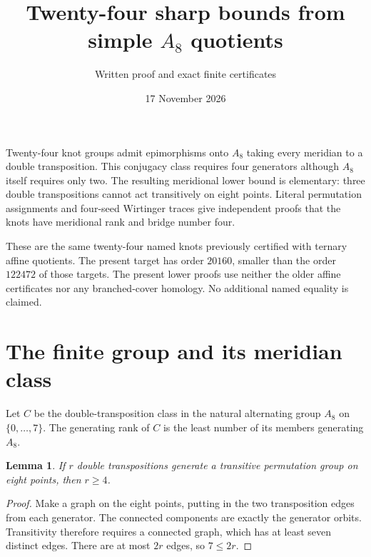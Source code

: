 \documentclass[11pt]{article}
\title{Twenty-four sharp bounds from simple $A_8$ quotients}
\author{Written proof and exact finite certificates}
\date{17 November 2026}
\newtheorem{lemma}[theorem]{Lemma}
\begin{document}
\maketitle

Twenty-four knot groups admit epimorphisms onto $A_8$ taking every
meridian to a double transposition. This conjugacy class requires four
generators although $A_8$ itself requires only two. The resulting
meridional lower bound is elementary: three double transpositions
cannot act transitively on eight points. Literal permutation assignments
and four-seed Wirtinger traces give independent proofs that the knots
have meridional rank and bridge number four.

These are the same twenty-four named knots previously certified with
ternary affine quotients. The present target has order $20160$, smaller
than the order $122472$ of those targets. The present lower proofs use
neither the older affine certificates nor any branched-cover homology.
No additional named equality is claimed.

\section{The finite group and its meridian class}

Let $C$ be the double-transposition class in the natural alternating
group $A_8$ on $\{0,\ldots,7\}$. The generating rank of $C$ is the
least number of its members generating $A_8$.

\begin{lemma}\label{lem:transitive}
If $r$ double transpositions generate a transitive permutation group
on eight points, then $r\ge4$.
\end{lemma}
\begin{proof}
Make a graph on the eight points, putting in the two transposition
edges from each generator. The connected components are exactly the
generator orbits. Transitivity therefore requires a connected graph,
which has at least seven distinct edges. There are at most $2r$
edges, so $7\le2r$.
\end{proof}
\end{document}
